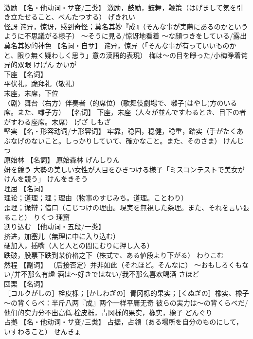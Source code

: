 \documentclass[8pt]{extreport}
\begin{document}
\begin{CJK}{UTF8}{min}
\\	激励	【名・他动词・サ变/三类】 激励，鼓励，鼓舞，鞭策（はげまして気を引き立たせること、べんたつする）	げきれい	
\\	怪訝	诧异，惊讶，感到奇怪；莫名其妙『成』（そんな事が実際にあるのかというように不思議がる様子） ～そうに見る/惊讶地看着 ～な顔つきをしている/露出莫名其妙的神色 【名词・自サ】 诧异，惊异（「そんな事が有っていいものかと、限り無く疑わしく思う」意の漢語的表現） 梅は～の目を睜った/小梅睁着诧异的双眼	けげん かいが	
\\	下座	【名词】 
\\	平伏礼，跪拜礼（敬礼） 
\\	末座，末席，下位 
\\	〈剧〉舞台（右方）伴奏者（的席位）（歌舞伎劇場で、囃子(はやし)方のいる席。また、囃子方） 【名词】 下座，末座（人々が並んですわるとき、目下の者がすわる座席。末席）	げざ しもざ	
\\	堅実	【名・形容动词/ナ形容词】 牢靠，稳固，稳健，稳重，踏实（手がたくあぶなげのないこと。しっかりしていて、確かなこと。また、そのさま）	けんじつ	
\\	原始林	【名詞】 原始森林	げんしりん	
\\	妍を競う	大勢の美しい女性が人目をひきつける様子「ミスコンテストで美女がけんを競う」	けんをきそう	
\\	理屈	【名词】 
\\	理论；道理；理；理由（物事のすじみち。道理。ことわり） 
\\	歪理；诡辩；借口（こじつけの理由。現実を無視した条理。また、それを言い張ること）	りくつ	理窟
\\	割り込む	【他动词・五段/一类】 
\\	挤进，加塞儿（無理に中に入り込む） 
\\	硬加入，插嘴（人と人との間にむりに押し入る） 
\\	跌破，股票下跌到某价格之下（株式で、ある値段より下がる）	わりこむ	
\\	然程	【副词】 （后接否定）并非如此（それほど。そんなに） ～おもしろくもない/并不那么有趣 酒は～好きではない/我不那么喜欢喝酒	さほど	
\\	団栗	【名词】 
\\	［コルクがしの］栓皮栎；［かしわぎの］青冈栎的果实；［くぬぎの］橡实、橡子 
\\	～の背くらべ：半斤八两『成』两个一样平庸无奇 彼らの実力は～の背くらべだ/他们的实力分不出高低.栓皮栎，青冈栎的果实，橡实，橡子	どんぐり	
\\	占拠	【名・他动词・サ变/三类】 占据，占领（ある場所を自分のものにして，いすわること）	せんきょ	

\end{CJK}
\end{document}
